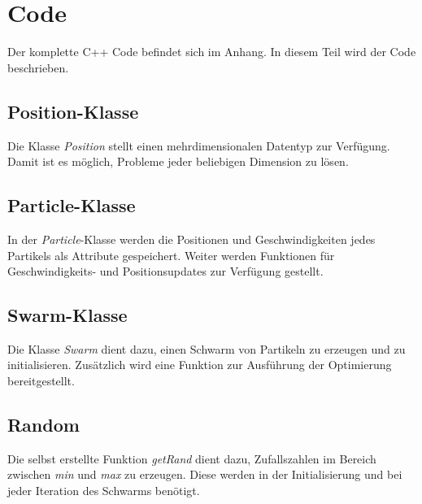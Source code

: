 \section{Code}
Der komplette C++ Code befindet sich im Anhang. In diesem Teil wird der Code beschrieben.

\subsection{Position-Klasse}
Die Klasse \textit{Position} stellt einen mehrdimensionalen Datentyp zur Verfügung. 
Damit ist es möglich, Probleme jeder beliebigen Dimension zu lösen.

\subsection{Particle-Klasse}
In der \textit{Particle}-Klasse werden die Positionen und Geschwindigkeiten jedes Partikels
als Attribute gespeichert. Weiter werden Funktionen für Geschwindigkeits- und Positionsupdates
zur Verfügung gestellt.

\subsection{Swarm-Klasse}
Die Klasse \textit{Swarm} dient dazu, einen Schwarm von Partikeln zu erzeugen und zu initialisieren.
Zusätzlich wird eine Funktion zur Ausführung der Optimierung bereitgestellt.

\subsection{Random}
Die selbst erstellte Funktion \textit{getRand} dient dazu, Zufallszahlen im Bereich zwischen \textit{min} und \textit{max} zu erzeugen. Diese werden in der Initialisierung und bei jeder Iteration des Schwarms benötigt. 